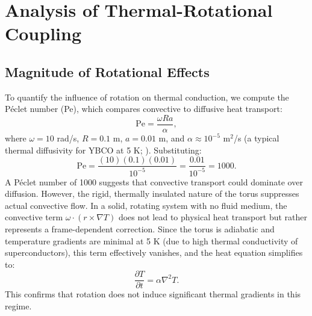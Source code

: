 \documentclass[12pt]{article}
\begin{document}
\section{Analysis of Thermal-Rotational Coupling}
\subsection{Magnitude of Rotational Effects}
To quantify the influence of rotation on thermal conduction, we compute the Péclet number (Pe), which compares convective to diffusive heat transport:
\begin{equation}
    \text{Pe} = \frac{\omega R a}{\alpha},
\end{equation}
where $\omega = 10$ rad/s, $R = 0.1$ m, $a = 0.01$ m, and $\alpha \approx 10^{-5}$ m$^2$/s (a typical thermal diffusivity for YBCO at 5 K; \citealp{Kittel2005}). Substituting:
\begin{equation}
    \text{Pe} = \frac{(10)(0.1)(0.01)}{10^{-5}} = \frac{0.01}{10^{-5}} = 1000.
\end{equation}
A Péclet number of 1000 suggests that convective transport could dominate over diffusion. However, the rigid, thermally insulated nature of the torus suppresses actual convective flow. In a solid, rotating system with no fluid medium, the convective term $\omega \cdot (r \times \nabla T)$ does not lead to physical heat transport but rather represents a frame-dependent correction. Since the torus is adiabatic and temperature gradients are minimal at 5 K (due to high thermal conductivity of superconductors), this term effectively vanishes, and the heat equation simplifies to:
\begin{equation}
    \frac{\partial T}{\partial t} = \alpha \nabla^2 T.
\end{equation}
This confirms that rotation does not induce significant thermal gradients in this regime.
\end{document}
